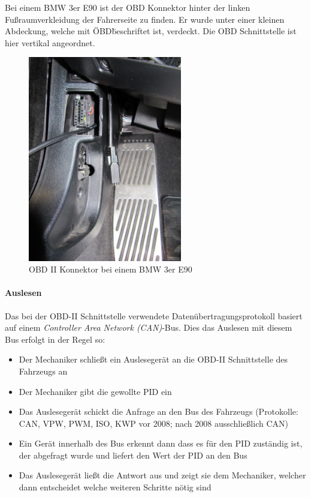 Bei einem BMW 3er E90 ist der OBD Konnektor hinter der linken Fußraumverkleidung der Fahrerseite zu finden. Er wurde unter einer kleinen Abdeckung, welche mit \"OBD\" beschriftet ist, verdeckt. Die OBD Schnittstelle ist hier vertikal angeordnet.

\begin{figure}[!htb]\centering
	\includegraphics[width=0.6\textwidth]{images/3erobd}
	\caption{OBD II Konnektor bei einem BMW 3er E90 \cite{SIMR.CH2-obd2.3erOBD}}\label{Fig:Data3}
\end{figure}

\paragraph{Auslesen}
Das bei der OBD-II Schnittstelle verwendete Datenübertragungsprotokoll basiert auf einem \textit{Controller Area Network (CAN)}-Bus. Dies das Auslesen mit diesem Bus erfolgt in der Regel so:
\begin{itemize}
	\item Der Mechaniker schließt ein Auslesegerät an die OBD-II Schnittstelle des Fahrzeugs an
	\item Der Mechaniker gibt die gewollte PID ein
	\item Das Auslesegerät schickt die Anfrage an den Bus des Fahrzeugs (Protokolle: CAN, VPW, PWM, ISO, KWP vor 2008; nach 2008 ausschließlich CAN)
	\item Ein Gerät innerhalb des Bus erkennt dann dass es für den PID zuständig ist, der abgefragt wurde und liefert den Wert der PID an den Bus
	\item Das Auslesegerät ließt die Antwort aus und zeigt sie dem Mechaniker, welcher dann entscheidet welche weiteren Schritte nötig sind
\end{itemize}

